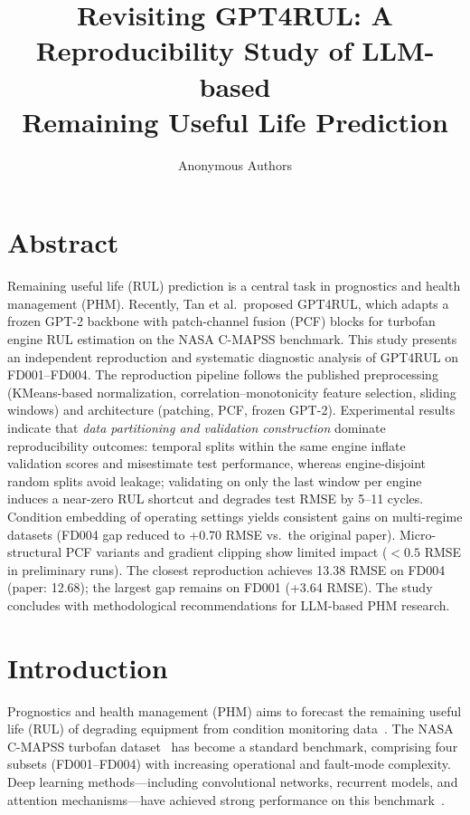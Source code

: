 \documentclass[10pt,twocolumn]{article}
\title{\textbf{Revisiting GPT4RUL: A Reproducibility Study of LLM-based\\Remaining Useful Life Prediction}}
\author{Anonymous Authors}
\date{}
\begin{document}
\maketitle

\section*{Abstract}

Remaining useful life (RUL) prediction is a central task in prognostics and health management (PHM).
Recently, Tan et al.\ proposed GPT4RUL, which adapts a frozen GPT-2 backbone with patch-channel fusion (PCF) blocks for turbofan engine RUL estimation on the NASA C-MAPSS benchmark.
This study presents an independent reproduction and systematic diagnostic analysis of GPT4RUL on FD001--FD004.
The reproduction pipeline follows the published preprocessing (KMeans-based normalization, correlation--monotonicity feature selection, sliding windows) and architecture (patching, PCF, frozen GPT-2).
Experimental results indicate that \emph{data partitioning and validation construction} dominate reproducibility outcomes: temporal splits within the same engine inflate validation scores and misestimate test performance, whereas engine-disjoint random splits avoid leakage; validating on only the last window per engine induces a near-zero RUL shortcut and degrades test RMSE by 5--11 cycles.
Condition embedding of operating settings yields consistent gains on multi-regime datasets (FD004 gap reduced to +0.70 RMSE vs.\ the original paper).
Micro-structural PCF variants and gradient clipping show limited impact ($<\!0.5$ RMSE in preliminary runs).
The closest reproduction achieves 13.38 RMSE on FD004 (paper: 12.68); the largest gap remains on FD001 (+3.64 RMSE).
The study concludes with methodological recommendations for LLM-based PHM research.

\section{Introduction}

Prognostics and health management (PHM) aims to forecast the remaining useful life (RUL) of degrading equipment from condition monitoring data~\cite{saxena2008}.
The NASA C-MAPSS turbofan dataset~\cite{saxena2008} has become a standard benchmark, comprising four subsets (FD001--FD004) with increasing operational and fault-mode complexity.
Deep learning methods---including convolutional networks, recurrent models, and attention mechanisms---have achieved strong performance on this benchmark~\cite{li2020,ellefsen2019}.
\end{document}
